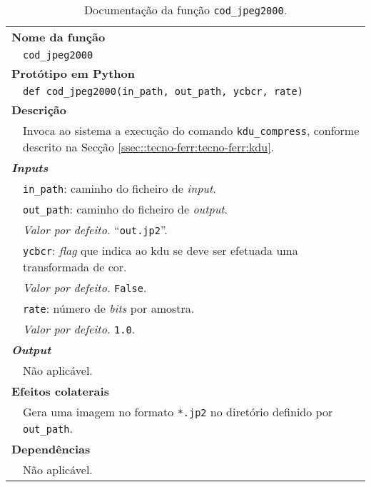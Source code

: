 \begin{table}[!hp]
    \centering
    \caption{Documentação da função \texttt{cod\_jpeg2000}.}
    \label{tab:cod_jpeg2000}
    \begin{tabular}{p{1cm} p{11.5cm}}
        \hline
        \multicolumn{2}{l}{\bfseries\small Nome da função}\\
         & \verb|cod_jpeg2000|\\
        \hline
        \multicolumn{2}{l}{\bfseries\small Protótipo em Python}\\
         & \texttt{def cod_jpeg2000(in_path, out_path, ycbcr, rate)} \\
        \hline\multicolumn{2}{l}{\bfseries\small Descrição}\\
         & Invoca ao sistema a execução do comando \verb|kdu_compress|, conforme descrito na Secção \ref{ssec::tecno-ferr:tecno-ferr:kdu}. \\
        \hline\multicolumn{2}{l}{\bfseries\small \textit{Inputs}}\\
         & \verb|in_path|: caminho do ficheiro de \textit{input}. \\
         & \verb|out_path|: caminho do ficheiro de \textit{output}. \\
         & \hspace{1cm} \textit{Valor por defeito.} ``\verb|out.jp2|''.\\
         & \verb|ycbcr|: \textit{flag} que indica ao \ac{kdu} se deve ser efetuada uma transformada de cor. \\
         & \hspace{1cm} \textit{Valor por defeito.} \verb|False|.\\
         & \verb|rate|: número de \textit{bits} por amostra. \\
         & \hspace{1cm} \textit{Valor por defeito.} \verb|1.0|.\\
        \hline\multicolumn{2}{l}{\bfseries\small \textit{Output}}\\
         & Não aplicável. \\
        \hline\multicolumn{2}{l}{\bfseries\small Efeitos colaterais}\\
         & Gera uma imagem no formato \verb|*.jp2| no diretório definido por \verb|out_path|. \\
        \hline\multicolumn{2}{l}{\bfseries\small Dependências}\\
         & Não aplicável. \\
        \hline
    \end{tabular}
\end{table}


